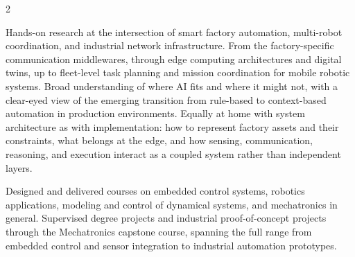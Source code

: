 


\makecvheader


\begin{paracol}{2}



Hands-on research at the intersection of smart factory automation, multi-robot coordination, and industrial network infrastructure.
From the factory-specific communication middlewares, through edge computing architectures and digital twins, up to fleet-level task planning and mission coordination for mobile robotic systems.
Broad understanding of where AI fits and where it might not, with a clear-eyed view of the emerging transition from rule-based to context-based automation in production environments.
Equally at home with system architecture as with implementation: how to represent factory assets and their constraints, what belongs at the edge, and how sensing, communication, reasoning, and execution interact as a coupled system rather than independent layers.

\divider

Designed and delivered courses on embedded control systems, robotics applications, modeling and control of dynamical systems, and mechatronics in general.
Supervised degree projects and industrial proof-of-concept projects through the Mechatronics capstone course, spanning the full range from embedded control and sensor integration to industrial automation prototypes.

\hfill




\end{paracol}
